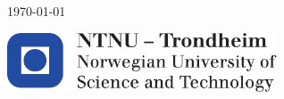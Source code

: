 \documentclass[pdftex,10pt,b5paper,twoside]{book}
\begin{document}
\begin{titlepage}
	
	\vfill\vfill\vfill %
	
	{\large\today} %
	
	
	\vfill\vfill
	\includegraphics[width=0.6\textwidth]{0_Images/logontnu.pdf}\\[1cm] %
	 
	
	\vfill %
	
\end{titlepage}
\let\cleardoublepage\clearpage


\tableofcontents
\listoffigures
\thispagestyle{empty} %
\newpage    

\setcounter{page}{1}









\newpage

\end{document}
